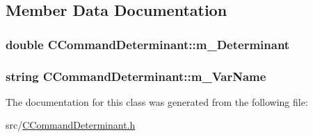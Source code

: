 \subsection{Member Data Documentation}
\subsubsection[{\texorpdfstring{m\+\_\+\+Determinant}{m_Determinant}}]{\setlength{\rightskip}{0pt plus 5cm}double C\+Command\+Determinant\+::m\+\_\+\+Determinant}\hypertarget{classCCommandDeterminant_a4a8778e30170613ead5997c7b18438c8}{}\label{classCCommandDeterminant_a4a8778e30170613ead5997c7b18438c8}
\subsubsection[{\texorpdfstring{m\+\_\+\+Var\+Name}{m_VarName}}]{\setlength{\rightskip}{0pt plus 5cm}string C\+Command\+Determinant\+::m\+\_\+\+Var\+Name\hspace{0.3cm}{\ttfamily [private]}}\hypertarget{classCCommandDeterminant_aa5df4a490c14743c5d6a4e65df406bc3}{}\label{classCCommandDeterminant_aa5df4a490c14743c5d6a4e65df406bc3}


The documentation for this class was generated from the following file\+:\begin{DoxyCompactItemize}
\item 
src/\hyperlink{CCommandDeterminant_8h}{C\+Command\+Determinant.\+h}\end{DoxyCompactItemize}
